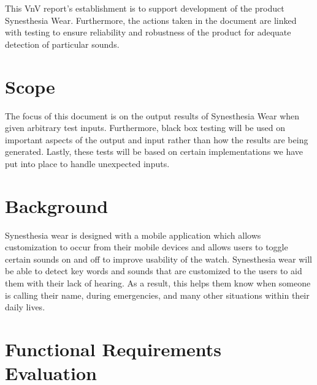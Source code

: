\documentclass[12pt, titlepage]{article}
\begin{document}
This VnV report's establishment is to support development of the product Synesthesia Wear. Furthermore, the actions taken in the document are linked with testing to ensure reliability and robustness of the product for adequate detection of particular sounds.

\section{Scope}

The focus of this document is on the output results of Synesthesia Wear when given arbitrary test inputs. Furthermore, black box testing will be used on important aspects of the output and input rather than how the results are being generated. Lastly, these tests will be based on certain implementations we have put into place to handle unexpected inputs.

\section{Background} 

Synesthesia wear is designed with a mobile application which allows customization to occur from their mobile devices and allows users to toggle certain sounds on and off to improve usability of the watch. Synesthesia wear will be able to detect key words and sounds that are customized to the users to aid them with their lack of hearing. As a result, this helps them know when someone is calling their name, during emergencies, and many other situations within their daily lives.


\section{Functional Requirements Evaluation}
\end{document}
